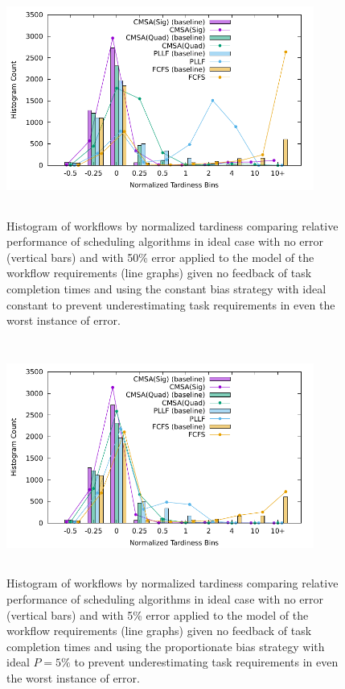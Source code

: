 \documentclass[10pt]{csce}
\begin{document}
\begin{figure}
	\begin{center}
		\includegraphics[width=0.9\textwidth,height=3in]{figures/Histogram_All_CompleteHighAllUniformError_WithCBias.pdf}
	\end{center}
	\caption{Histogram of workflows by normalized tardiness comparing
		relative performance of scheduling algorithms in ideal case with no
		error (vertical bars) and with 50\% error applied to the model of the
		workflow requirements (line graphs) given no feedback of task
		completion times and using the constant bias strategy with ideal
		constant to prevent underestimating task requirements in even the
		worst instance of error.}
	\label{fig:nofeedback-cbias-higherror}
\end{figure}

\begin{figure}
	\begin{center}
		\includegraphics[width=0.9\textwidth,height=3in]{figures/Histogram_All_CompleteMediumAllUniformError_WithRBias.pdf}
	\end{center}
	\caption{Histogram of workflows by normalized tardiness comparing
		relative performance of scheduling algorithms in ideal case with no
		error (vertical bars) and with 5\% error applied to the model of the
		workflow requirements (line graphs) given no feedback of task
		completion times and using the proportionate bias strategy with ideal
		$P=5\%$ to prevent underestimating task requirements in even the
		worst instance of error.}
	\label{fig:nofeedback-pbias-mederror}
\end{figure}
\end{document}
